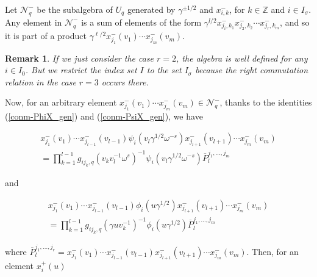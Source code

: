 \documentclass[12pt]{amsart}
\newtheorem{rem}[thm]{Remark}
\numberwithin{equation}{section}
\newcommand{\Z}{\ensuremath{\mathbb{Z}}}
\newcommand{\mc}[1]{\mathcal{#1}}
\begin{document}
Let $\mc{N}_q^{-}$ be the subalgebra of $U_q$ generated by $\gamma^{\pm 1/2}$ and $x_{i,k}^{-}$, for $k \in \Z$ and $i\in I_\sigma$. Any element in $\mc{N}_q^{-}$ is a sum of elements of the form $\gamma^{l/2}x_{j_i,k_1}^{-}x_{j_2,k_2}^{-}\cdots x_{j_r,k_m}^{-}$, and so it is part of a product $\gamma^{\ell/2}x_{j_1}^{-}(v_1)\cdots x_{j_m}^{-}(v_m)$. 

\begin{rem}
    If we just consider the case $r=2$, the algebra is well defined for any $i\in I_0$. But we restrict the index set $I$ to the set $I_\sigma$ because the right commutation relation in the case $r=3$ occurs there.  
\end{rem}


Now, for an arbitrary element $ x_{j_1}^{-}(v_1)\cdots x_{j_m}^{-}(v_m)\in \mc{N}_q^-$, thanks to the identities (\ref{conm-PhiX_gen}) and (\ref{conm-PsiX_gen}), we have

\begin{multline}\label{xpsigen}
    x_{j_1}^{-}(v_1)\cdots x_{j_{l-1}}^{-}(v_{l-1}) \psi_i(v_l\gamma^{1/2}\omega^{-s})x_{j_{l+1}}^{-}(v_{l+1}) \cdots  x_{j_m}^{-}(v_m)\\
    =  \prod_{k=1}^{l-1} g_{ij_k,q}(v_{k}v_l^{-1}\omega^s)^{-1} \psi_i(v_l\gamma^{1/2}\omega^{-s}) \overline{P}_l^{j_1, \ldots, j_m}
\end{multline}

and 

\begin{multline}\label{xphigen}
    x_{j_1}^{-}(v_1)\cdots x_{j_{l-1}}^{-}(v_{l-1}) \phi_i(u\gamma^{1/2})x_{j_{l+1}}^{-}(v_{l+1}) \cdots  x_{j_m}^{-}(v_m)\\
    = \prod_{k=1}^{l-1} g_{ij_k,q}(\gamma uv_{k}^{-1})^{-1} \phi_i(u\gamma^{1/2}) \overline{P}_l^{j_1, \ldots, j_m}
\end{multline}

where $\overline{P}_l^{j_1, \ldots, j_r} = x_{j_1}^{-}(v_1)\cdots x_{j_{l-1}}^{-}(v_{l-1}) x_{j_{l+1}}^{-}(v_{l+1}) \cdots  x_{j_m}^{-}(v_m)$. Then, for an element $x_i^+(u)$
\end{document}

